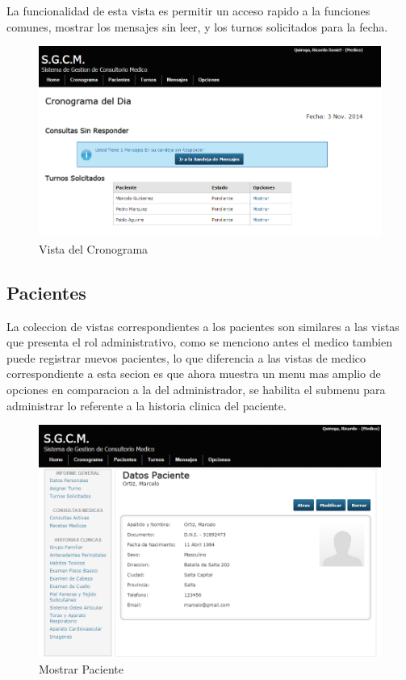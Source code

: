 La funcionalidad de esta vista es permitir un acceso rapido a la funciones comunes,
mostrar los mensajes sin leer, y los turnos solicitados para la fecha.

\begin{figure}[H]
    \centering
    \includegraphics[scale=0.5]{resourse/cronograma.png}
    \caption{Vista del Cronograma}
    \label{fig:614}
\end{figure}


\subsection{Pacientes}

La coleccion de vistas correspondientes a los pacientes son similares a las vistas
que presenta el rol administrativo, como se menciono antes el medico tambien puede
registrar nuevos pacientes, lo que diferencia a las vistas de medico correspondiente
a esta secion es que ahora muestra un menu mas amplio de opciones en comparacion 
a la del administrador, se habilita el submenu para administrar lo referente a la
historia clinica del paciente.

\begin{figure}[H]
    \centering
    \includegraphics[scale=0.5]{resourse/datos-paciente-m.png}
    \caption{Mostrar Paciente}
    \label{fig:615}
\end{figure}

